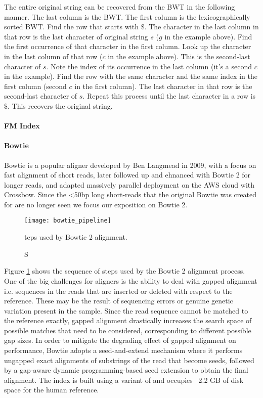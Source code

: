 The entire original string can be recovered from the BWT in the following manner. The last column is the BWT. The first column is the lexicographically sorted BWT. Find the row that starts with $\$$. The character in the last column in that row is the last character of original string $s$ ($g$ in the example above). Find the first occurrence of that character in the first column. Look up the character in the last column of that row ($c$ in the example above). This is the second-last character of $s$. Note the index of its occurrence in the last column (it's a second $c$ in the example). Find the row with the same character and the same index in the first column (second $c$ in the first column). The last character in that row is the second-last character of $s$. Repeat this process until the last character in a row is $\$$. This recovers the original string.

\paragraph{FM Index}

\paragraph{Bowtie}

Bowtie is a popular aligner developed by Ben Langmead in 2009, with a focus on fast alignment of short reads\autocite{langmead2009ultrafast}, later followed up and ehnanced with Bowtie 2 for longer reads\autocite{langmead2012fast}, and adapted massively parallel deployment on the AWS cloud with Crossbow\autocite{langmead2009searching}. Since the <50bp long short-reads that the original Bowtie was created for are no longer seen we focus our exposition on Bowtie 2.

\begin{figure}[H]
    \texttt{[image: bowtie\_pipeline]}
    \centering
    \caption Steps used by Bowtie 2 alignment.\autocite{langmead2012fast}
    \label{fig:bowtie_pipeline}
\end{figure}

Figure \ref{fig:bowtie_pipeline} shows the sequence of steps used by the Bowtie 2 alignment process. One of the big challenges for aligners is the ability to deal with gapped alignment i.e. sequences in the reads that are inserted or deleted with respect to the reference. These may be the result of sequencing errors or genuine genetic variation present in the sample. Since the read sequence cannot be matched to the reference exactly, gapped alignment drastically increases the search space of possible matches that need to be considered, corresponding to different possible gap sizes. In order to mitigate the degrading effect of gapped alignment on performance, Bowtie adopts a seed-and-extend mechanism where it performs ungapped exact alignments of substrings of the read that become seeds, followed by a gap-aware dynamic programming-based seed extension to obtain the final alignment. The index is built using a variant of \autocite{karkkainen2003simple} and occupies ~2.2 GB of disk space for the human reference.

